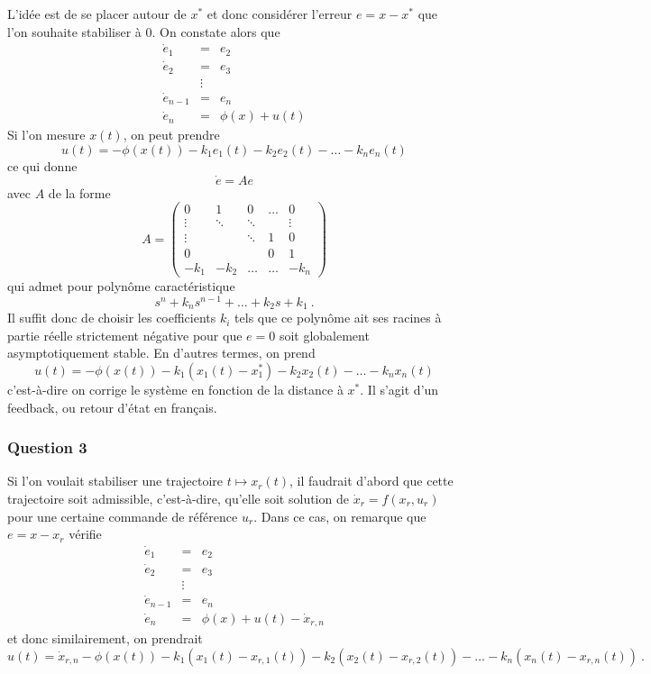
L'idée est de se placer autour de \(x^*\) et donc considérer l'erreur
\(e = x-x^*\) que l'on souhaite stabiliser à 0. On constate alors que \[
\begin{array}{rcl}
\dot{e}_1 &=& e_2 \\
\dot{e}_2 &=& e_3 \\
&\vdots&\\
\dot{e}_{n-1} &=& e_n \\
\dot{e}_n &=& \phi(x) + u(t)
\end{array}
\] Si l'on mesure \(x(t)\), on peut prendre \[
u(t) = -\phi(x(t)) -k_1 e_1(t) - k_2 e_2(t) - \ldots - k_n e_n(t)
\] ce qui donne \[
\dot{e} = A e
\] avec \(A\) de la forme \[
A = \left(
\begin{array}{ccccc}
0&1&0 & \ldots & 0 \\
\vdots &\ddots & \ddots & & \vdots\\
\vdots&&\ddots & 1  &0\\
0&&&0&1 \\
-k_1 &-k_2&\ldots& \ldots& -k_n
\end{array}
\right)
\] qui admet pour polynôme caractéristique \[
s^n + k_n s^{n-1} + \ldots + k_2 s + k_1\ .
\] Il suffit donc de choisir les coefficients \(k_i\) tels que ce
polynôme ait ses racines à partie réelle strictement négative pour que
\(e=0\) soit globalement asymptotiquement stable. En d'autres termes, on
prend \[
u(t) = -\phi(x(t)) -k_1 (x_1(t)-x_1^*) - k_2 x_2(t) - \ldots - k_n x_n(t)
\] c'est-à-dire on corrige le système en fonction de la distance à
\(x^*\). Il s'agit d'un feedback, ou retour d'état en français.

\hypertarget{answer-cont-lin-3}{%
\subsubsection*{Question 3}\label{answer-cont-lin-3}}


Si l'on voulait stabiliser une trajectoire \(t\mapsto x_r(t)\), il
faudrait d'abord que cette trajectoire soit admissible, c'est-à-dire,
qu'elle soit solution de \(\dot{x}_r=f(x_r,u_r)\) pour une certaine
commande de référence \(u_r\). Dans ce cas, on remarque que
\(e = x-x_r\) vérifie \[
\begin{array}{rcl}
\dot{e}_1 &=& e_2 \\
\dot{e}_2 &=& e_3 \\
&\vdots&\\
\dot{e}_{n-1} &=& e_n \\
\dot{e}_n &=& \phi(x) + u(t) - \dot x_{r,n}
\end{array}
\] et donc similairement, on prendrait \[
u(t) = \dot x_{r,n}-\phi(x(t)) -k_1 (x_1(t)-x_{r,1}(t)) - k_2 (x_2(t) -x_{r,2}(t)) - \ldots - k_n (x_n(t)-x_{r,n}(t)) \ .
\]


